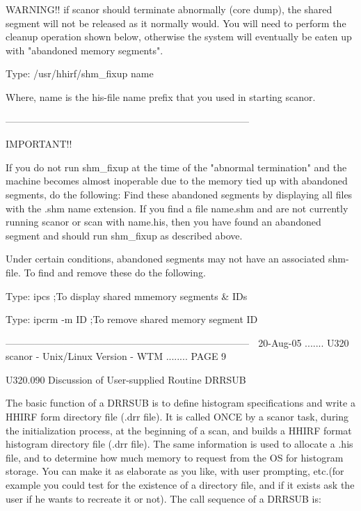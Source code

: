  
   WARNING!!  if  scanor  should  terminate abnormally (core dump), the shared
   segment will not be released  as  it  normally  would.  You  will  need  to
   perform  the  cleanup  operation  shown  below,  otherwise  the system will
   eventually be eaten up with "abandoned memory segments".
 
   Type: /usr/hhirf/shm_fixup name
 
   Where, name is the his-file name prefix that you used in starting scanor.
 
   ---------------------------------------------------------------------------
 
                                   IMPORTANT!!
 
   If you do not run shm_fixup at the time of the "abnormal  termination"  and
   the  machine  becomes  almost  inoperable  due  to  the memory tied up with
   abandoned segments, do the following:  Find  these  abandoned  segments  by
   displaying  all  files  with  the  .shm  name extension. If you find a file
   name.shm and are not currently running scanor or scan with  name.his,  then
   you  have  found an abandoned segment and should run shm_fixup as described
   above.
 
   Under certain conditions, abandoned segments may  not  have  an  associated
   shm-file. To find and remove these do the following.
 
   Type: ipcs           ;To display shared mmemory segments & IDs
 
   Type: ipcrm -m ID    ;To remove  shared memory  segment    ID
 
   ---------------------------------------------------------------------------
    
   20-Aug-05 ....... U320  scanor - Unix/Linux Version - WTM ........ PAGE   9
 
 
   U320.090  Discussion of User-supplied Routine DRRSUB
 
   The  basic  function  of a DRRSUB is to define histogram specifications and
   write a HHIRF form directory file (.drr file).  It  is  called  ONCE  by  a
   scanor  task,  during  the  initialization  process,  at the beginning of a
   scan, and builds a HHIRF format histogram directory file (.drr  file).  The
   same information is used to allocate a .his file, and to determine how much
   memory  to  request  from  the OS for histogram storage. You can make it as
   elaborate as you like, with user  prompting,  etc.(for  example  you  could
   test  for  the existence of a directory file, and if it exists ask the user
   if he wants to recreate it or not). The call sequence of a DRRSUB is:
 
